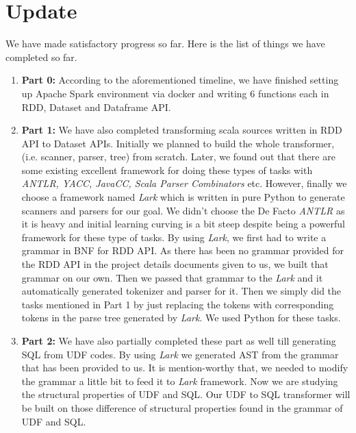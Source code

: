 \documentclass[sigplan]{acmart}\settopmatter{printfolios=true,printccs=false,printacmref=false}
\begin{document}
\section{Update}
We have made satisfactory progress so far. Here is the list of things we have completed so far.

\begin{enumerate}
	\item \textbf{Part 0:} According to the aforementioned timeline, we have finished setting up Apache Spark environment via docker and writing 6 functions each in RDD, Dataset and Dataframe API.
	\item \textbf{Part 1:}  We have also completed transforming scala sources written in RDD API to Dataset APIs. Initially we planned to build the whole transformer, (i.e. scanner, parser, tree) from scratch. Later, we found out that there are some existing excellent framework for doing these types of tasks with \textit{ANTLR, YACC, JavaCC, Scala Parser Combinators} etc. However, finally we choose a framework named \textit{Lark} which is written in pure Python to generate scanners and parsers for our goal. We didn't choose the De Facto \textit{ANTLR} as it is heavy and initial learning curving is a bit steep despite being a powerful framework for these type of tasks. By using \textit{Lark}, we first had to write a grammar in BNF for RDD API. As there has been no grammar provided for the RDD API in the project details documents given to us, we built that grammar on our own. Then we passed that grammar to the \textit{Lark} and it automatically generated tokenizer and parser for it. Then we simply did the tasks mentioned in Part 1 by just replacing the tokens with corresponding tokens in the parse tree generated by \textit{Lark}. We used Python for these tasks.
	\item \textbf{Part 2:} We have also partially completed these part as well till generating SQL from UDF codes. By using \textit{Lark} we generated AST from the grammar that has been provided to us. It is mention-worthy that, we needed to modify the grammar a little bit to feed it to \textit{Lark} framework. Now we are studying the structural properties of UDF and SQL. Our UDF to SQL transformer will be built on those difference of structural properties found in the grammar of UDF and SQL. 
\end{enumerate}
\end{document}
